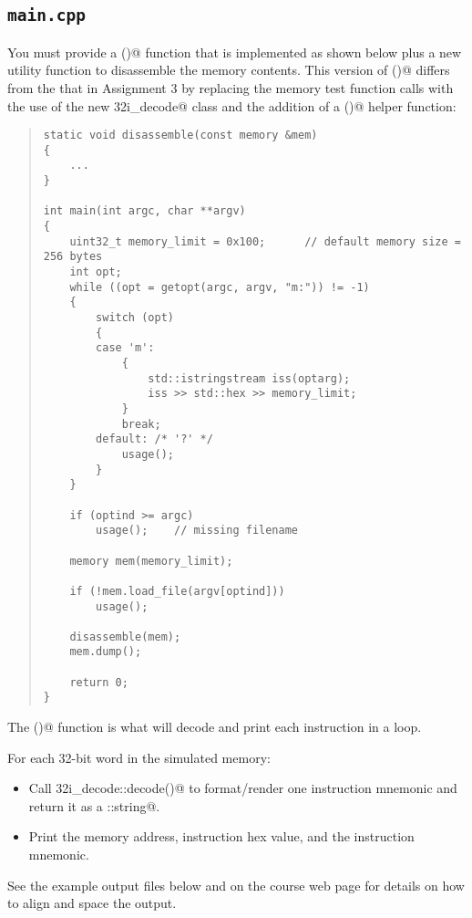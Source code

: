 \documentclass[11pt]{article}
\begin{document}
\subsection{\tt main.cpp}

You must provide a \verb@main()@ function that is implemented as shown 
below plus a new utility function to disassemble the memory contents.  
This version of \verb@main()@ differs from the that in Assignment 3 by 
replacing the memory test function calls with the use of the new 
\verb@rv32i_decode@ class and the addition of a \verb@disassemble()@
helper function:

\begin{quote}
{\small
\begin{verbatim}
static void disassemble(const memory &mem)
{
    ...
}

int main(int argc, char **argv)
{
    uint32_t memory_limit = 0x100;      // default memory size = 256 bytes
    int opt;
    while ((opt = getopt(argc, argv, "m:")) != -1)
    {
        switch (opt)
        {
        case 'm':
            {
                std::istringstream iss(optarg);
                iss >> std::hex >> memory_limit;
            }
            break;
        default: /* '?' */
            usage();
        }
    }

    if (optind >= argc)
        usage();    // missing filename

    memory mem(memory_limit);

    if (!mem.load_file(argv[optind]))
        usage();

    disassemble(mem);
    mem.dump();

    return 0;
}
\end{verbatim}
}
\end{quote}

The \verb@disassemble()@ function is what will decode and print each instruction in a loop.

For each 32-bit word in the simulated memory:
\begin{itemize}
\item 
Call \verb@rv32i_decode::decode()@ to format/render one instruction mnemonic 
and return it as a \verb@std::string@.  

\item 
Print the memory address, instruction hex value, and the instruction mnemonic.
\end{itemize}

See the example output files below and on the course web page for details on 
how to align and space the output. 
\end{document}
